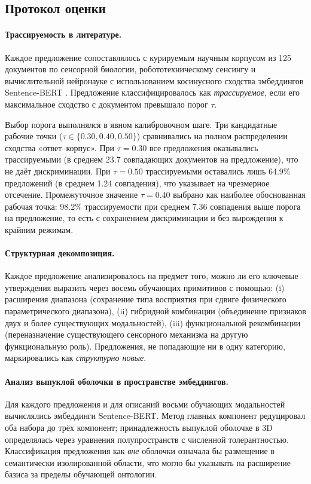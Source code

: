 \documentclass[sn-mathphys-num]{sn-jnl}
\begin{document}
\subsection{Протокол оценки}

\paragraph{Трассируемость в литературе.}
Каждое предложение сопоставлялось с курируемым научным корпусом из 125 документов по сенсорной биологии, робототехническому сенсингу и вычислительной нейронауке с использованием косинусного сходства эмбеддингов Sentence-BERT \cite{reimers2019sentencebert}. Предложение классифицировалось как \emph{трассируемое}, если его максимальное сходство с документом превышало порог $\tau$.

Выбор порога выполнялся в явном калибровочном шаге. Три кандидатные рабочие точки ($\tau \in \{0.30, 0.40, 0.50\}$) сравнивались на полном распределении сходства «ответ--корпус». При $\tau=0.30$ все предложения оказывались трассируемыми (в среднем 23.7 совпадающих документов на предложение), что не даёт дискриминации. При $\tau=0.50$ трассируемыми оставались лишь 64.9\% предложений (в среднем 1.24 совпадения), что указывает на чрезмерное отсечение. Промежуточное значение $\tau=0.40$ выбрано как наиболее обоснованная рабочая точка: 98.2\% трассируемости при среднем 7.36 совпадения выше порога на предложение, то есть с сохранением дискриминации и без вырождения к крайним режимам.

\paragraph{Структурная декомпозиция.}
Каждое предложение анализировалось на предмет того, можно ли его ключевые утверждения выразить через восемь обучающих примитивов с помощью: (i) расширения диапазона (сохранение типа восприятия при сдвиге физического параметрического диапазона), (ii) гибридной комбинации (объединение признаков двух и более существующих модальностей), (iii) функциональной рекомбинации (переназначение существующего сенсорного механизма на другую функциональную роль). Предложения, не попадающие ни в одну категорию, маркировались как \emph{структурно новые}.

\paragraph{Анализ выпуклой оболочки в пространстве эмбеддингов.}
Для каждого предложения и для описаний восьми обучающих модальностей вычислялись эмбеддинги Sentence-BERT. Метод главных компонент редуцировал оба набора до трёх компонент; принадлежность выпуклой оболочке в 3D определялась через уравнения полупространств с численной толерантностью. Классификация предложения как \emph{вне} оболочки означала бы размещение в семантически изолированной области, что могло бы указывать на расширение базиса за пределы обучающей онтологии.
\end{document}
